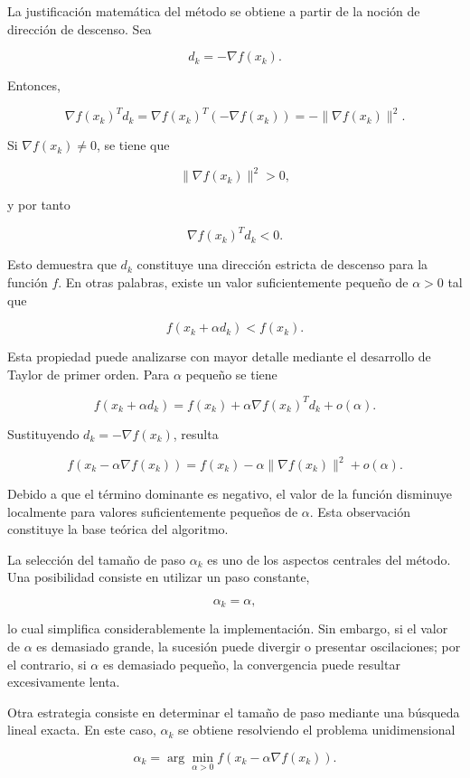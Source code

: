 \documentclass[
  spanish,
  us-letterpaper,
]{scrreprt}
\theoremstyle{definition}
\theoremstyle{remark}
\begin{document}
La justificación matemática del método se obtiene a partir de la noción
de dirección de descenso. Sea

\[
d_k = -\nabla f(x_k).
\]

Entonces,

\[
\nabla f(x_k)^T d_k
=
\nabla f(x_k)^T (-\nabla f(x_k))
=
-\|\nabla f(x_k)\|^2.
\]

Si \(\nabla f(x_k) \neq 0\), se tiene que

\[
\|\nabla f(x_k)\|^2 > 0,
\]

y por tanto

\[
\nabla f(x_k)^T d_k < 0.
\]

Esto demuestra que \(d_k\) constituye una dirección estricta de descenso
para la función \(f\). En otras palabras, existe un valor
suficientemente pequeño de \(\alpha > 0\) tal que

\[
f(x_k + \alpha d_k) < f(x_k).
\]

Esta propiedad puede analizarse con mayor detalle mediante el desarrollo
de Taylor de primer orden. Para \(\alpha\) pequeño se tiene

\[
f(x_k + \alpha d_k)
=
f(x_k) + \alpha \nabla f(x_k)^T d_k + o(\alpha).
\]

Sustituyendo \(d_k = -\nabla f(x_k)\), resulta

\[
f(x_k - \alpha \nabla f(x_k))
=
f(x_k) - \alpha \|\nabla f(x_k)\|^2 + o(\alpha).
\]

Debido a que el término dominante es negativo, el valor de la función
disminuye localmente para valores suficientemente pequeños de
\(\alpha\). Esta observación constituye la base teórica del algoritmo.

La selección del tamaño de paso \(\alpha_k\) es uno de los aspectos
centrales del método. Una posibilidad consiste en utilizar un paso
constante,

\[
\alpha_k = \alpha,
\]

lo cual simplifica considerablemente la implementación. Sin embargo, si
el valor de \(\alpha\) es demasiado grande, la sucesión puede divergir o
presentar oscilaciones; por el contrario, si \(\alpha\) es demasiado
pequeño, la convergencia puede resultar excesivamente lenta.

Otra estrategia consiste en determinar el tamaño de paso mediante una
búsqueda lineal exacta. En este caso, \(\alpha_k\) se obtiene
resolviendo el problema unidimensional

\[
\alpha_k = \arg\min_{\alpha > 0} f(x_k - \alpha \nabla f(x_k)).
\]
\end{document}
